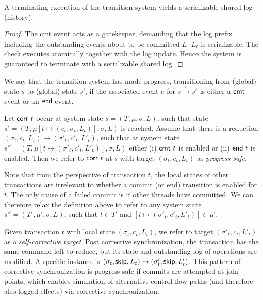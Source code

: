 
\begin{theorem}[Soundness] A terminating execution of the transition system yields a serializable shared log (history).
\begin{proof}
	The {\sf cmt} event acts as a gatekeeper, demanding that the log prefix including the outstanding events about to be committed $L\cdot L_t$ is serializable. The check executes atomically together with the log update. Hence the system is guaranteed to terminate with a serializable shared log.	
\end{proof}
\end{theorem}

\begin{definition}[Progress]
	We say that the transition system has made progress, transitioning from (global) state $s$ to (global) state $s'$, if the associated event $e$ for
	$s \stackrel{e}{\longrightarrow} s'$ is either a ${\sf cmt}$ event or an ${\sf end}$ event.
\end{definition}

\begin{definition}
	Let ${\sf corr}\ t$ occur at system state $s=(T,\mu,\sigma,L)$, such that state $s'=(T,\mu[t \mapsto (c_t,\sigma_t,L_t)],\sigma,L)$ is reached. Assume that there is a reduction
	$(\sigma_t,c_t,L_t) {\longrightarrow} (\sigma'_t,c'_t,L'_t)$, such that 
	at system state $s''=(T,\mu[t \mapsto (\sigma'_t,c'_t,L'_t)],\sigma,L)$ either (i)  ${\sf cmt}\ t$ is enabled or (ii) ${\sf end}\ t$ is enabled. Then we refer to ${\sf corr}\ t$ at $s$ with target $(\sigma_t,c_t,L_t)$ as \emph{progress safe}.
\end{definition}

Note that from the perspective of transaction $t$, the local states of other transactions are irrelevant to whether a commit (or end) transition is enabled for $t$. The only cause of a failed commit is if other threads have committed. We can therefore relax the definition above to refer to any system state $s''=(T',\mu',\sigma,L)$, such that $t \in T'$ and 
$[t \mapsto  (\sigma'_t,c'_t,L'_t)] \in \mu'$.

\begin{example}\label{Ex:selfwarp}
	Given transaction $t$ with local state $(\sigma_t,c_t,L_t)$, we refer to target
	$(\sigma'_t,c_t,L'_t)$ as a \emph{self-corrective target}. Post corrective synchronization, the transaction has the same command left to reduce, but its state and outstanding log of operations are modified. A specific instance is $(\sigma_t,{\sf skip},L_t) \rightarrow (\sigma'_t,{\sf skip},L'_t)$. This pattern of corrective synchronization is progress safe if commits are attempted at join points, which enables simulation of alternative control-flow paths (and therefore also logged effects) via corrective synchronization.
\end{example}

